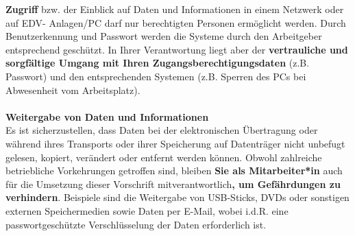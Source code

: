 \documentclass[../Vorlagen/de-RSE_Kopf,a4paper]{scrlttr2}
\begin{document}
\begin{addmargin}[10mm]{0mm}
\textbf{Zugriff} bzw. der Einblick auf Daten und Informationen in einem Netzwerk oder auf EDV- Anlagen/PC darf nur berechtigten Personen ermöglicht werden. Durch Benutzerkennung und Passwort werden die Systeme durch den Arbeitgeber entsprechend geschützt. In Ihrer Verantwortung liegt aber der \textbf{vertrauliche und sorgfältige Umgang mit Ihren Zugangsberechtigungsdaten} (z.B. Passwort) und den entsprechenden Systemen (z.B. Sperren des PCs bei Abwesenheit vom Arbeitsplatz). \\
\\
\textbf{Weitergabe von Daten und Informationen} \\
Es ist sicherzustellen, dass Daten bei der elektronischen Übertragung oder während ihres Transports oder ihrer Speicherung auf Datenträger nicht unbefugt gelesen, kopiert, verändert oder entfernt werden können. Obwohl zahlreiche betriebliche Vorkehrungen getroffen sind, bleiben \textbf{Sie als Mitarbeiter*in} auch für die Umsetzung dieser Vorschrift mitverantwortlich\textbf{, um Gefährdungen zu verhindern}. Beispiele sind die Weitergabe von USB-Sticks, DVDs oder sonstigen externen Speichermedien sowie Daten per E-Mail, wobei i.d.R. eine passwortgeschützte Verschlüsselung der Daten erforderlich ist.
\end{addmargin}
\end{document}
